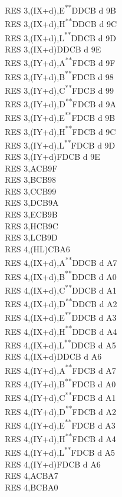 \documentclass[12pt,twoside,openright,a4paper]{book}
\newcommand{\UNDOC}{\textnormal{\textsuperscript{**}}}
\begin{document}
\begin{multicols}{3}
{\begin{tabbing}
	RES 3,(IX+d),E\UNDOC\>DDCB d 9B\\
	RES 3,(IX+d),H\UNDOC\>DDCB d 9C\\
	RES 3,(IX+d),L\UNDOC\>DDCB d 9D\\
	RES 3,(IX+d)\>DDCB d 9E\\
	RES 3,(IY+d),A\UNDOC\>FDCB d 9F\\
	RES 3,(IY+d),B\UNDOC\>FDCB d 98\\
	RES 3,(IY+d),C\UNDOC\>FDCB d 99\\
	RES 3,(IY+d),D\UNDOC\>FDCB d 9A\\
	RES 3,(IY+d),E\UNDOC\>FDCB d 9B\\
	RES 3,(IY+d),H\UNDOC\>FDCB d 9C\\
	RES 3,(IY+d),L\UNDOC\>FDCB d 9D\\
	RES 3,(IY+d)\>FDCB d 9E\\
	RES 3,A\>CB9F\\
	RES 3,B\>CB98\\
	RES 3,C\>CB99\\
	RES 3,D\>CB9A\\
	RES 3,E\>CB9B\\
	RES 3,H\>CB9C\\
	RES 3,L\>CB9D\\
	RES 4,(HL)\>CBA6\\
	RES 4,(IX+d),A\UNDOC\>DDCB d A7\\
	RES 4,(IX+d),B\UNDOC\>DDCB d A0\\
	RES 4,(IX+d),C\UNDOC\>DDCB d A1\\
	RES 4,(IX+d),D\UNDOC\>DDCB d A2\\
	RES 4,(IX+d),E\UNDOC\>DDCB d A3\\
	RES 4,(IX+d),H\UNDOC\>DDCB d A4\\
	RES 4,(IX+d),L\UNDOC\>DDCB d A5\\
	RES 4,(IX+d)\>DDCB d A6\\
	RES 4,(IY+d),A\UNDOC\>FDCB d A7\\
	RES 4,(IY+d),B\UNDOC\>FDCB d A0\\
	RES 4,(IY+d),C\UNDOC\>FDCB d A1\\
	RES 4,(IY+d),D\UNDOC\>FDCB d A2\\
	RES 4,(IY+d),E\UNDOC\>FDCB d A3\\
	RES 4,(IY+d),H\UNDOC\>FDCB d A4\\
	RES 4,(IY+d),L\UNDOC\>FDCB d A5\\
	RES 4,(IY+d)\>FDCB d A6\\
	RES 4,A\>CBA7\\
	RES 4,B\>CBA0\\

\end{tabbing}}
\end{multicols}
\end{document}
